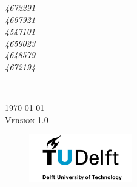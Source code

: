 \begin{titlepage}
\begin{minipage}{0.3\textwidth}
\begin{flushright}
\emph{ 
        4672291                    \\
        4667921                     \\
        4547101                     \\
        4659023                     \\
        4648579                     \\
        4672194                     \\}
          
 \textsc{} %
\end{flushright}
\end{minipage}\\[1.5cm]





\vfill %

{\large \monthyeardate\today}\\ %
\textsc{Version 1.0}\\[0.5cm]





\vfill %
\begin{figure}[H]
    \centering
    \includegraphics[width=0.4\textwidth]{Images/titlepage/tudelft-logo (1).jpg}
    \label{coverfigure}
\end{figure}



\end{titlepage}
